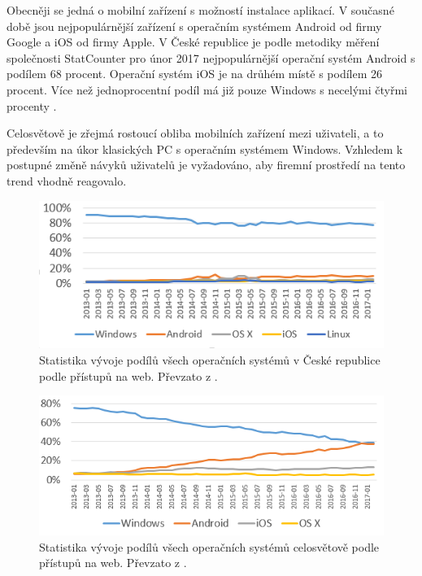  Obecněji se jedná o mobilní zařízení s možností instalace aplikací. V současné době jsou nejpopulárnější zařízení s operačním systémem Android od firmy Google a iOS od firmy Apple. V České republice je podle metodiky měření společnosti StatCounter pro únor 2017 nejpopulárnější operační systém Android s podílem 68 procent. Operační systém iOS je na drůhém místě s podílem 26 procent. Více než jednoprocentní podíl má již pouze Windows s necelými čtyřmi procenty \cite{HNAndroid}. 
 

 
Celosvětově je zřejmá rostoucí obliba mobilních zařízení mezi uživateli, a to především na úkor klasických PC s operačním systémem Windows. Vzhledem k postupné změně návyků uživatelů je vyžadováno, aby firemní prostředí na tento trend vhodně reagovalo. 


\begin{figure}[h!]
\centering
\includegraphics[width=13cm]{img/4_vyvoj_vse_CZ}
\caption{Statistika vývoje podílů všech operačních systémů v České republice podle přístupů na web. Převzato z \cite{Statcounter1}.} 
\centering
\end{figure}

\begin{figure}[h!]
\centering
\includegraphics[width=13cm]{img/5_vyvoj_vse_global}
\caption{Statistika vývoje podílů všech operačních systémů celosvětově podle přístupů na web. Převzato z \cite{Statcounter2}.} 
\centering
\end{figure}
 
